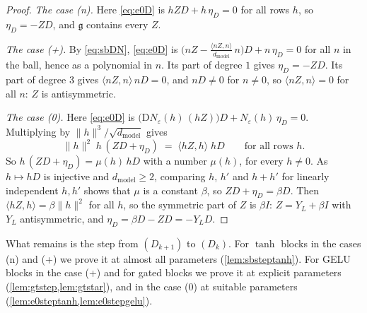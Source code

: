 \documentclass[10pt]{article}
\theoremstyle{definition}
\theoremstyle{remark}
\newcommand{\dm}{d_{\mathrm{model}}}
\newcommand{\Der}{\mathrm{D}}
\newcommand{\norm}[1]{\lVert #1\rVert}
\begin{document}
\begin{proof}
\emph{The case (n).} Here \eqref{eq:e0D} is $hZD + h\,\eta_D = 0$ for all rows $h$, so $\eta_D = -ZD$, and $\mathfrak g$ contains every $Z$.

\emph{The case (+).} By \eqref{eq:sbDN}, \eqref{eq:e0D} is $\big(nZ - \frac{\langle nZ, n\rangle}{\dm}\,n\big)D + n\,\eta_D = 0$ for all $n$ in the ball, hence as a polynomial in $n$. Its part of degree $1$ gives $\eta_D = -ZD$. Its part of degree $3$ gives $\langle nZ, n\rangle\,nD = 0$, and $nD \neq 0$ for $n \neq 0$, so $\langle nZ, n\rangle = 0$ for all $n$: $Z$ is antisymmetric.

\emph{The case (0).} Here \eqref{eq:e0D} is $\big(\Der N_\varepsilon(h)\,(hZ)\big)D + N_\varepsilon(h)\,\eta_D = 0$. Multiplying by $\norm{h}^3/\sqrt{\dm}$ gives
\[
\norm{h}^2\;h\,(ZD + \eta_D) \;=\; \langle hZ, h\rangle\;hD \qquad\text{for all rows } h .
\]
So $h\,(ZD + \eta_D) = \mu(h)\,hD$ with a number $\mu(h)$, for every $h \neq 0$. As $h \mapsto hD$ is injective and $\dm \ge 2$, comparing $h$, $h'$ and $h + h'$ for linearly independent $h, h'$ shows that $\mu$ is a constant $\beta$, so $ZD + \eta_D = \beta D$. Then $\langle hZ, h\rangle = \beta\norm{h}^2$ for all $h$, so the symmetric part of $Z$ is $\beta I$: $Z = Y_L + \beta I$ with $Y_L$ antisymmetric, and $\eta_D = \beta D - ZD = -Y_LD$.
\end{proof}

What remains is the step from $(D_{k+1})$ to $(D_k)$. For $\tanh$ blocks in the cases (n) and (+) we prove it at almost all parameters (\cref{lem:sbsteptanh}). For GELU blocks in the case (+) and for gated blocks we prove it at explicit parameters (\cref{lem:gtstep,lem:gtstar}), and in the case (0) at suitable parameters (\cref{lem:e0steptanh,lem:e0stepgelu}).
\end{document}
